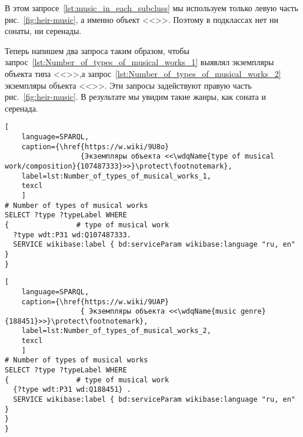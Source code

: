 
В этом запросе~\ref{lst:music_in_each_subcluss} мы используем только левую часть рис.~\ref{fig:heir-music}, а именно объект  <<>>. Поэтому в подклассах нет ни сонаты, ни серенады.

Теперь напишем два запроса таким образом, чтобы запрос~\ref{lst:Number_of_types_of_musical_works_1} выявлял экземпляры объекта типа <<>>,а запрос~\ref{lst:Number_of_types_of_musical_works_2} экземпляры объекта <<>>. Эти запросы задействуют правую часть рис.~\ref{fig:heir-music}. В результате мы увидим такие жанры, как соната и серенада.

\begin{lstlisting}[ 
    language=SPARQL,
    caption={\href{https://w.wiki/9U8o}
                  {Экземпляры объекта <<\wdqName{type of musical work/composition}{107487333}>>}\protect\footnotemark},
    label=lst:Number_of_types_of_musical_works_1,
    texcl
    ]
# Number of types of musical works
SELECT ?type ?typeLabel WHERE 
{                # type of musical work
  ?type wdt:P31 wd:Q107487333.      
  SERVICE wikibase:label { bd:serviceParam wikibase:language "ru, en" }
}
\end{lstlisting}%

\begin{lstlisting}[ 
    language=SPARQL,
    caption={\href{https://w.wiki/9UAP}
                  { Экземпляры объекта <<\wdqName{music genre}{188451}>>}\protect\footnotemark},
    label=lst:Number_of_types_of_musical_works_2,
    texcl
    ]
# Number of types of musical works
SELECT ?type ?typeLabel WHERE 
{                # type of musical work
  {?type wdt:P31 wd:Q188451} .
  SERVICE wikibase:label { bd:serviceParam wikibase:language "ru, en" }
}
}
\end{lstlisting}%

